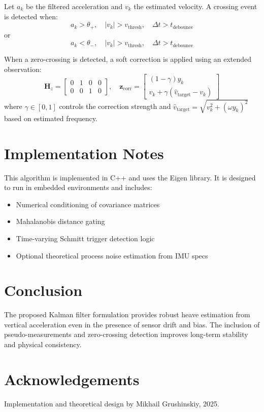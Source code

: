 \documentclass[11pt,letterpaper]{article}
\begin{document}
Let \( a_k \) be the filtered acceleration and \( v_k \) the estimated velocity. A crossing event is detected when:
\[
a_k > \theta_{+}, \quad |v_k| > v_\text{thresh}, \quad \Delta t > t_\text{debounce}
\]
or
\[
a_k < \theta_{-}, \quad |v_k| > v_\text{thresh}, \quad \Delta t > t_\text{debounce}
\]

When a zero-crossing is detected, a soft correction is applied using an extended observation:
\[
\mathbf{H}_z =
\begin{bmatrix}
0 & 1 & 0 & 0 \\
0 & 0 & 1 & 0
\end{bmatrix}, \quad
\mathbf{z}_\text{corr} =
\begin{bmatrix}
(1 - \gamma)y_k \\
v_k + \gamma(\hat{v}_\text{target} - v_k)
\end{bmatrix}
\]
where \( \gamma \in [0,1] \) controls the correction strength and \( \hat{v}_\text{target} = \sqrt{v_k^2 + (\omega y_k)^2} \) based on estimated frequency.

\section{Implementation Notes}

This algorithm is implemented in C++ and uses the Eigen library. It is designed to run in embedded environments and includes:
\begin{itemize}
  \item Numerical conditioning of covariance matrices
  \item Mahalanobis distance gating
  \item Time-varying Schmitt trigger detection logic
  \item Optional theoretical process noise estimation from IMU specs
\end{itemize}

\section{Conclusion}
The proposed Kalman filter formulation provides robust heave estimation from vertical acceleration even in the presence of sensor drift and bias. The inclusion of pseudo-measurements and zero-crossing detection improves long-term stability and physical consistency.

\section*{Acknowledgements}
Implementation and theoretical design by Mikhail Grushinskiy, 2025.
\end{document}
